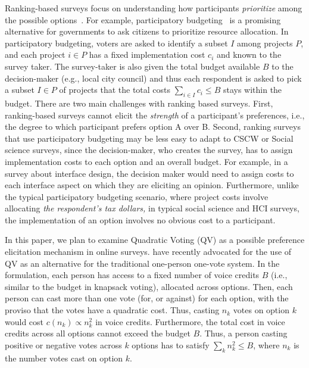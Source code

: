 Ranking-based surveys focus on understanding how participants \textit{prioritize} among the possible options~\cite{moors2016two}. For example, participatory budgeting~\cite{cabannes2004participatory,goel2015knapsack,Goel2016, Lee2014, benade2020preference} is a promising alternative for governments to ask citizens to prioritize resource allocation.  In participatory budgeting, voters are asked to identify a subset $I$ among projects $P$, and each project $i \in P$ has a fixed implementation cost $c_i$ and known to the survey taker. The survey-taker is also given the total budget available $B$ to the decision-maker (e.g., local city council) and thus each respondent is asked to pick a subset $I \in P$ of projects that the total costs $\sum_{i \in I} c_i \leqslant B$ stays within the budget. There are two main challenges with ranking based surveys. First, ranking-based surveys cannot elicit the \textit{strength} of a participant's preferences, i.e., the degree to which participant prefers option A over B. Second, ranking surveys that use participatory budgeting may be less easy to adapt to CSCW or Social science surveys, since the decision-maker, who creates the survey, has to assign implementation costs to each option and an overall budget. For example, in a survey about interface design, the decision maker would need to assign costs to each interface aspect on which they are eliciting an opinion. Furthermore, unlike the typical participatory budgeting scenario, where project costs involve allocating \textit{the respondent's tax dollars,} in typical social science and HCI surveys, the implementation of an option involves no obvious cost to a participant. 




In this paper, we plan to examine Quadratic Voting (QV) as a possible preference elicitation mechanism in online surveys. \textcite{posner2018radical} have recently advocated for the use of QV as an alternative for the traditional one-person one-vote system. In the \textcite{posner2018radical} formulation, each person has access to a fixed number of voice credits $B$ (i.e., similar to the budget in knapsack voting), allocated across options. Then, each person can cast more than one vote (for, or against) for each option, with the proviso that the votes have a quadratic cost. Thus, casting $n_k$ votes on option $k$ would cost $c(n_k) \propto n_k^2$ in voice credits. Furthermore, the total cost in voice credits across all options cannot exceed the budget $B$. Thus, a person casting positive or negative votes across $k$ options has to satisfy $\sum_k n_k^2 \leqslant B$, where $n_k$ is the number votes cast on option $k$. 

